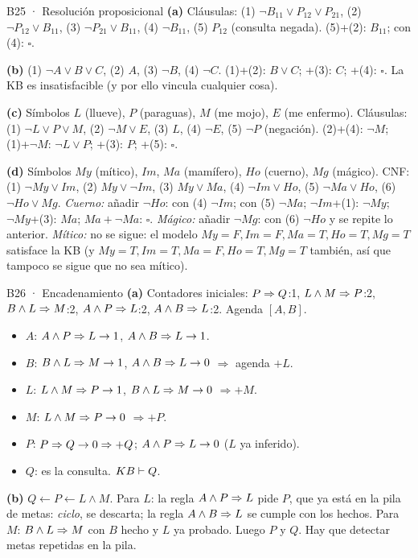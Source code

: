 \begin{solucion}{B25 · Resolución proposicional}
\textbf{(a)} Cláusulas: (1) $\neg B_{11}\vee P_{12}\vee P_{21}$, (2) $\neg P_{12}\vee B_{11}$, (3) $\neg P_{21}\vee B_{11}$,
(4) $\neg B_{11}$, (5) $P_{12}$ (consulta negada). (5)+(2): $B_{11}$; con (4): $\square$.

\textbf{(b)} (1) $\neg A\vee B\vee C$, (2) $A$, (3) $\neg B$, (4) $\neg C$. (1)+(2): $B\vee C$; +(3): $C$; +(4): $\square$.
La KB es insatisfacible (y por ello vincula cualquier cosa).

\textbf{(c)} Símbolos $L$ (llueve), $P$ (paraguas), $M$ (me mojo), $E$ (me enfermo). Cláusulas:
(1) $\neg L\vee P\vee M$, (2) $\neg M\vee E$, (3) $L$, (4) $\neg E$, (5) $\neg P$ (negación).
(2)+(4): $\neg M$; (1)+$\neg M$: $\neg L\vee P$; +(3): $P$; +(5): $\square$.

\textbf{(d)} Símbolos $My$ (mítico), $Im$, $Ma$ (mamífero), $Ho$ (cuerno), $Mg$ (mágico). CNF:
(1) $\neg My\vee Im$, (2) $My\vee\neg Im$, (3) $My\vee Ma$, (4) $\neg Im\vee Ho$, (5) $\neg Ma\vee Ho$, (6) $\neg Ho\vee Mg$.
\emph{Cuerno:} añadir $\neg Ho$: con (4) $\neg Im$; con (5) $\neg Ma$; $\neg Im$+(1): $\neg My$; $\neg My$+(3): $Ma$; $Ma+\neg Ma$: $\square$.
\emph{Mágico:} añadir $\neg Mg$: con (6) $\neg Ho$ y se repite lo anterior. \emph{Mítico:} no se sigue: el modelo
$My=F,Im=F,Ma=T,Ho=T,Mg=T$ satisface la KB (y $My=T,Im=T,Ma=F,Ho=T,Mg=T$ también, así que tampoco se sigue que no sea mítico).
\end{solucion}

\begin{solucion}{B26 · Encadenamiento}
\textbf{(a)} Contadores iniciales: $P\Rightarrow Q$:1, $L\wedge M\Rightarrow P$:2, $B\wedge L\Rightarrow M$:2, $A\wedge P\Rightarrow L$:2,
$A\wedge B\Rightarrow L$:2. Agenda $[A,B]$.
\begin{itemize}[nosep]
\item $A$: $A\wedge P\Rightarrow L\to1$, $A\wedge B\Rightarrow L\to1$.
\item $B$: $B\wedge L\Rightarrow M\to1$, $A\wedge B\Rightarrow L\to0$ $\Rightarrow$ agenda $+L$.
\item $L$: $L\wedge M\Rightarrow P\to1$, $B\wedge L\Rightarrow M\to0$ $\Rightarrow +M$.
\item $M$: $L\wedge M\Rightarrow P\to0$ $\Rightarrow +P$.
\item $P$: $P\Rightarrow Q\to0\Rightarrow+Q$; $A\wedge P\Rightarrow L\to0$ ($L$ ya inferido).
\item $Q$: es la consulta. $KB\vdash Q$.
\end{itemize}
\textbf{(b)} $Q\leftarrow P\leftarrow L\wedge M$. Para $L$: la regla $A\wedge P\Rightarrow L$ pide $P$, que ya está en la
pila de metas: \emph{ciclo}, se descarta; la regla $A\wedge B\Rightarrow L$ se cumple con los hechos. Para $M$:
$B\wedge L\Rightarrow M$ con $B$ hecho y $L$ ya probado. Luego $P$ y $Q$. Hay que detectar metas repetidas en la pila.
\end{solucion}

